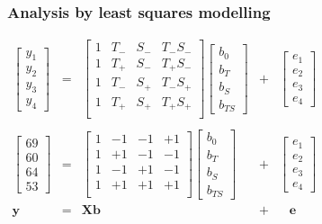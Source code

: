 \begin{frame}\frametitle{Analysis by least squares modelling}

	$
	\begin{array}{rcccl}
		\begin{bmatrix}
			y_1\\
			y_2\\
			y_3 \\
			y_4
		\end{bmatrix}
		&=&
		\begin{bmatrix}
			1 & T_{-} & S_{-} & T_{-}S_{-}\\
			1 & T_{+} & S_{-} & T_{+}S_{-}\\
			1 & T_{-} & S_{+} & T_{-}S_{+}\\
			1 & T_{+} & S_{+} & T_{+}S_{+}\\
		\end{bmatrix}
		\begin{bmatrix}
			b_0 \\
			b_T \\
			b_S \\
			b_{TS}
		\end{bmatrix}
		&+&
		\begin{bmatrix}
			e_1\\
			e_2\\
			e_3 \\
			e_4
		\end{bmatrix}
		\\
		\\
		\begin{bmatrix}
			69\\
			60\\
			64\\
			53
		\end{bmatrix}
		&=&
		\begin{bmatrix}
			1 & -1 & -1 & +1\\
			1 & +1 & -1 & -1\\
			1 & -1 & +1 & -1\\
			1 & +1 & +1 & +1\\
		\end{bmatrix}
		\begin{bmatrix}
			b_0 \\
			b_T \\
			b_S \\
			b_{TS}
		\end{bmatrix}
		&+&
		\begin{bmatrix}
			e_1\\
			e_2\\
			e_3 \\
			e_4
		\end{bmatrix}
		\\
		\mathbf{y} &=& \mathbf{X} \mathbf{b} &+& \,\,\,\,\,\mathbf{e} \\
	\end{array}
	$
\end{frame}

